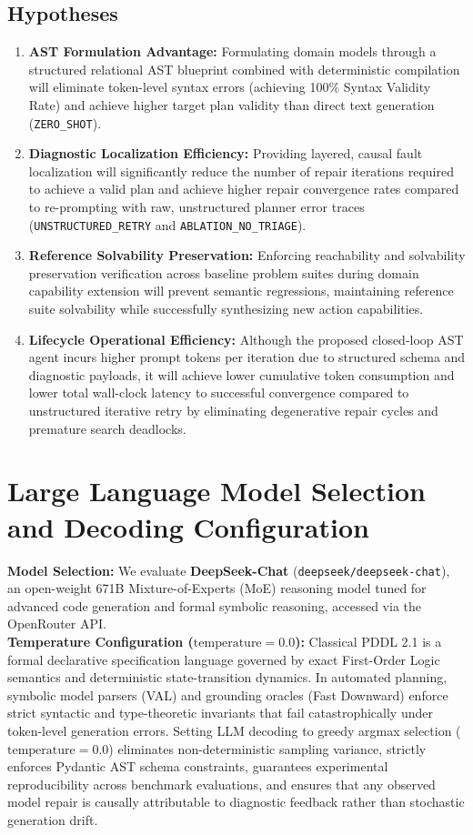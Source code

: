 \documentclass[11pt,a4paper]{article}
\begin{document}
\subsection{Hypotheses}
\begin{enumerate}[label=\textbf{(H\arabic*)}, nosep, leftmargin=2.2em]
    \item \textbf{AST Formulation Advantage:} Formulating domain models through a structured relational AST blueprint combined with deterministic compilation will eliminate token-level syntax errors (achieving 100\% Syntax Validity Rate) and achieve higher target plan validity than direct text generation (\texttt{ZERO\_SHOT}).
    \item \textbf{Diagnostic Localization Efficiency:} Providing layered, causal fault localization will significantly reduce the number of repair iterations required to achieve a valid plan and achieve higher repair convergence rates compared to re-prompting with raw, unstructured planner error traces (\texttt{UNSTRUCTURED\_RETRY} and \texttt{ABLATION\_NO\_TRIAGE}).
    \item \textbf{Reference Solvability Preservation:} Enforcing reachability and solvability preservation verification across baseline problem suites during domain capability extension will prevent semantic regressions, maintaining reference suite solvability while successfully synthesizing new action capabilities.
    \item \textbf{Lifecycle Operational Efficiency:} Although the proposed closed-loop AST agent incurs higher prompt tokens per iteration due to structured schema and diagnostic payloads, it will achieve lower cumulative token consumption and lower total wall-clock latency to successful convergence compared to unstructured iterative retry by eliminating degenerative repair cycles and premature search deadlocks.
\end{enumerate}

\section{Large Language Model Selection and Decoding Configuration}
\textbf{Model Selection:} We evaluate \textbf{DeepSeek-Chat} (\texttt{deepseek/deepseek-chat}), an open-weight 671B Mixture-of-Experts (MoE) reasoning model tuned for advanced code generation and formal symbolic reasoning, accessed via the OpenRouter API.\\
\textbf{Temperature Configuration ($\text{temperature} = 0.0$):} Classical PDDL 2.1 is a formal declarative specification language governed by exact First-Order Logic semantics and deterministic state-transition dynamics. In automated planning, symbolic model parsers (VAL) and grounding oracles (Fast Downward) enforce strict syntactic and type-theoretic invariants that fail catastrophically under token-level generation errors. Setting LLM decoding to greedy argmax selection ($\text{temperature} = 0.0$) eliminates non-deterministic sampling variance, strictly enforces Pydantic AST schema constraints, guarantees experimental reproducibility across benchmark evaluations, and ensures that any observed model repair is causally attributable to diagnostic feedback rather than stochastic generation drift.
\end{document}
